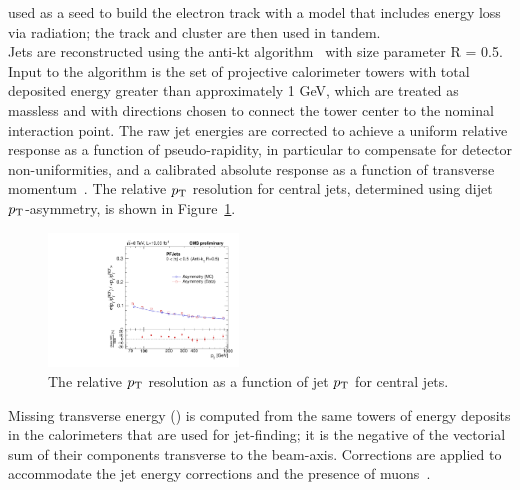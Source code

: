 used as a seed to build the electron track with a model that includes energy loss via
radiation; the track and cluster are then used in tandem.\\
\indent Jets are reconstructed using the anti-kt algorithm~\cite{antikt} with size parameter R = 0.5.
Input to the algorithm is the set of projective calorimeter towers with total deposited
energy greater than approximately 1 GeV, which are treated as massless and with
directions chosen to connect the tower center to the nominal interaction point. The
raw jet energies are corrected to achieve a uniform relative response as a function
of pseudo-rapidity, in particular to compensate for detector non-uniformities, and a
calibrated absolute response as a function of transverse momentum~\cite{Chatrchyan:2011ds}.
The relative $p_{\mathrm{T}}$ resolution for central jets, determined using dijet $p_{\mathrm{T}}$-asymmetry, is shown in
Figure~\ref{fig:jetRes}. 

\begin{figure}[h!]
  \begin{center}
      \includegraphics[width=0.45\textwidth,]{figures/ak5pf_relRes}
      \caption{\label{fig:jetRes} The relative $p_{\mathrm{T}}$ resolution as a function of jet $p_{\mathrm{T}}$
              for central jets.}
  \end{center}
\end{figure}

Missing transverse energy (\met) is computed from the same towers of energy deposits 
in the calorimeters that are used for jet-finding; it is the negative of the vectorial
sum of their components transverse to the beam-axis. Corrections are applied to
accommodate the jet energy corrections and the presence of muons~\cite{1748-0221-6-09-P09001}.

